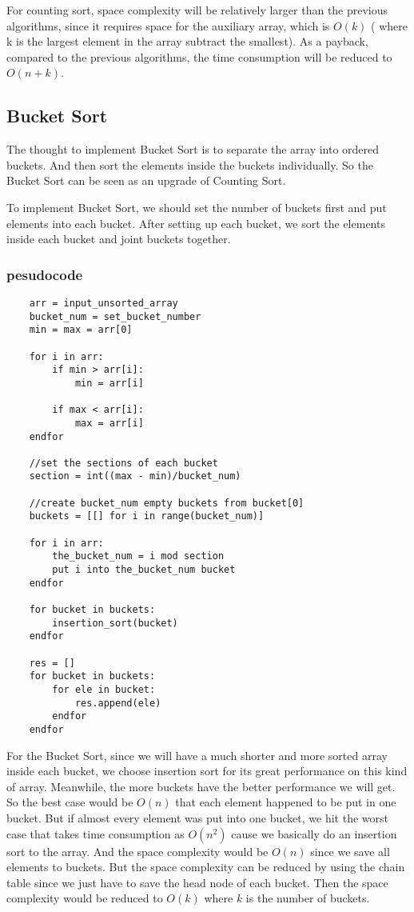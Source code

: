 \documentclass[12pt]{article}
\begin{document}
For counting sort, space complexity will be relatively larger than the previous algorithms, since it requires space for the auxiliary array, which is $O(k)$ ( where k is the largest element in the array subtract the smallest). As a payback, compared to the previous algorithms, the time consumption will be reduced to $O(n+k)$.

\subsection{Bucket Sort}

The thought to implement Bucket Sort is to separate the array into ordered buckets. And then sort the elements inside the buckets individually. So the Bucket Sort can be seen as an upgrade of Counting Sort. 

To implement Bucket Sort, we should set the number of buckets first and put elements into each bucket. After setting up each bucket, we sort the elements inside each bucket and joint buckets together.

\subsubsection*{pesudocode}

\begin{verbatim}
    arr = input_unsorted_array
    bucket_num = set_bucket_number
    min = max = arr[0]

    for i in arr:
        if min > arr[i]:
            min = arr[i]
        
        if max < arr[i]:
            max = arr[i]
    endfor
    
    //set the sections of each bucket
    section = int((max - min)/bucket_num)

    //create bucket_num empty buckets from bucket[0]
    buckets = [[] for i in range(bucket_num)]

    for i in arr:
        the_bucket_num = i mod section
        put i into the_bucket_num bucket
    endfor

    for bucket in buckets:
        insertion_sort(bucket)
    endfor

    res = []
    for bucket in buckets:
        for ele in bucket:
            res.append(ele)
        endfor
    endfor
\end{verbatim}

For the Bucket Sort, since we will have a much shorter and more sorted array inside each bucket, we choose insertion sort for its great performance on this kind of array.
Meanwhile, the more buckets have the better performance we will get. So the best case would be $O(n)$ that each element happened to be put in one bucket. But if almost every element was put into one bucket, we hit the worst case that takes time consumption as $O(n^2)$ cause we basically do an insertion sort to the array. And the space complexity would be $O(n)$ since we save all elements to buckets. But the space complexity can be reduced by using the chain table since we just have to save the head node of each bucket. Then the space complexity would be reduced to $O(k)$ where $k$ is the number of buckets. 
\end{document}
